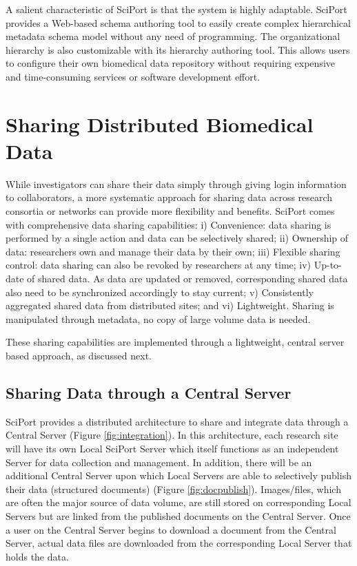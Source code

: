 \documentclass{doublecol-new}
\theoremstyle{TH}{
\newtheorem{lemma}{Lemma}
\newtheorem{theorem}[lemma]{Theorem}
\newtheorem{corrolary}[lemma]{Corrolary}
\newtheorem{conjecture}[lemma]{Conjecture}
\newtheorem{proposition}[lemma]{Proposition}
\newtheorem{claim}[lemma]{Claim}
\newtheorem{stheorem}[lemma]{Wrong Theorem}
\newtheorem{algorithm}{Algorithm}
}
\theoremstyle{THrm}{
\newtheorem{definition}{Definition}[section]
\newtheorem{question}{Question}[section]
\newtheorem{remark}{Remark}
\newtheorem{scheme}{Scheme}
}
\theoremstyle{THhit}{
\newtheorem{case}{Case}[section]
}
\begin{document}
A salient characteristic of SciPort is that the system is highly
adaptable.  SciPort provides a Web-based schema authoring tool to
easily create complex hierarchical metadata schema  model without
any need of programming.  The organizational hierarchy is also
customizable with its hierarchy authoring tool. This allows users to
configure their own biomedical data repository without requiring
expensive and time-consuming services or software development
effort.



\section{Sharing Distributed Biomedical Data} \label{sec:sharing}


While investigators can share their data simply through giving login
information to collaborators, a more systematic approach for sharing
data across research consortia or networks can provide more
flexibility and benefits. SciPort comes with comprehensive data
sharing capabilities: i) Convenience: data sharing is performed by a
single action and data can be selectively shared; ii) Ownership of
data: researchers own and manage their data by their own;  iii)
Flexible sharing control: data sharing can also be revoked by
researchers at any time;  iv) Up-to-date of shared data. As data are
updated or removed, corresponding shared data also need to be
synchronized accordingly to stay current;  v) Consistently
aggregated shared data from distributed sites; and vi) Lightweight.
Sharing is manipulated through metadata, no copy of large volume
data is needed.


These sharing capabilities are implemented through a lightweight,
central server based approach, as discussed next.

\subsection{Sharing Data through a Central Server}


SciPort provides a distributed architecture to share and integrate
data through a Central Server (Figure \ref{fig:integration}). In
this architecture, each research site will have its own Local
SciPort Server which itself functions as an independent Server for
data collection and management. In addition, there will be an
additional Central  Server upon which Local Servers are able to
selectively publish their data (structured documents) (Figure
\ref{fig:docpublish}). Images/files, which are often the major
source of data volume, are still stored on corresponding Local
Servers but are linked from the published documents on the Central
Server. Once a user on the Central Server begins to download a
document from the Central Server, actual data files are downloaded
from the corresponding Local Server that holds the data.
\end{document}
